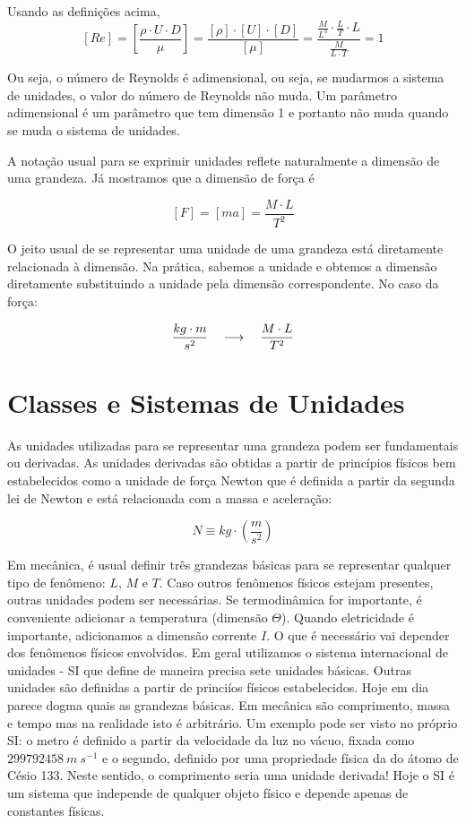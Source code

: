 Usando as definições acima,
\[
  [Re] = \left[ \frac{\rho \cdot U \cdot D}{\mu} \right] = \frac{[\rho]\cdot[U]\cdot [D]}{[\mu]} = \frac{\frac{M}{L^3}\cdot\frac{L}{T}\cdot L}{\frac{M}{L\cdot T}} = 1
\]

Ou seja, o número de Reynolds é adimensional, ou seja, se mudarmos a sistema de unidades, o valor do número de Reynolds não muda. Um parâmetro adimensional é um parâmetro que tem dimensão 1 e portanto não muda quando se muda o sistema de unidades.

A notação usual para se exprimir unidades reflete naturalmente a dimensão de uma grandeza. Já mostramos que a dimensão de força é

\[
  [F] = [ma] = \frac{M\cdot L}{T^2}
\]
  
O jeito usual de se representar uma unidade de uma grandeza está diretamente relacionada à dimensão. Na prática, sabemos a unidade e obtemos a dimensão diretamente substituindo a unidade pela dimensão correspondente. No caso da força:

\[
\frac{kg\cdot m}{s^2} \quad\longrightarrow\quad \frac{M\cdot L}{T^2}
\]
    
  
\section{Classes e Sistemas de Unidades}

As unidades utilizadas para se representar uma grandeza podem ser fundamentais ou derivadas. As unidades derivadas são obtidas a partir de princípios físicos bem estabelecidos como a unidade de força Newton que é definida a partir da segunda lei de Newton e está relacionada com a massa e aceleração:

\[
N \equiv kg \cdot\left(\frac{m}{s^2}\right)
\]

Em mecânica, é usual definir três grandezas básicas para se representar qualquer tipo de fenômeno: $L$, $M$ e $T$. Caso outros fenômenos físicos estejam presentes, outras unidades podem ser necessárias. Se termodinâmica for importante, é conveniente adicionar a temperatura (dimensão $\Theta$). Quando eletricidade é importante, adicionamos a dimensão corrente $I$. O que é necessário vai depender dos fenômenos físicos envolvidos. Em geral utilizamos o sistema internacional de unidades \cite{BIPM19}  - SI que define de maneira precisa sete unidades básicas. Outras unidades são definidas a partir de princiíos físicos estabelecidos. Hoje em dia parece dogma quais as grandezas básicas. Em mecânica são comprimento, massa e tempo mas na realidade isto é arbitrário. Um exemplo pode ser visto no próprio SI: o metro é definido a partir da velocidade da luz no vácuo, fixada como $299 792 458 \: m\:s^{-1}$ e o segundo, definido por uma propriedade física da do átomo de Césio 133. Neste sentido, o comprimento seria uma unidade derivada! Hoje o SI é um sistema que independe de qualquer objeto físico e depende apenas de constantes físicas.

